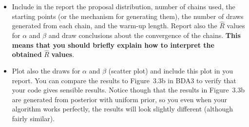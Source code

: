 \documentclass[a4paper,11pt]{article}
\begin{document}
\begin{itemize}
\item Include in the report the proposal distribution, number of chains used, the starting points (or the mechanism for generating them), the number of draws generated from each chain, and the warm-up length. Report also the $\hat R$ values for $\alpha$ and $\beta$ and draw conclusions about the convergence of the chains.
\textbf{This means that you should briefly explain how to interpret the obtained} $\hat R$ \textbf{values}.
\item Plot also the draws for $\alpha$ and $\beta$ (scatter plot) and include this plot in you report. You can compare the results to Figure~3.3b in BDA3 to verify that your code gives sensible results. Notice though that the results in Figure~3.3b are generated from posterior with uniform prior, so you even when your algorithm works perfectly, the results will look slightly different (although fairly similar).
\end{itemize}
\end{document}
